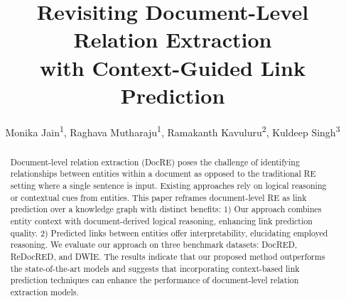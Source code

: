 \documentclass[letterpaper]{article} %
\title{Revisiting Document-Level Relation Extraction \\ with Context-Guided Link Prediction}
\author {
    Monika Jain\textsuperscript{\rm 1},
    Raghava Mutharaju\textsuperscript{\rm 1},
    Ramakanth Kavuluru\textsuperscript{\rm 2},
    Kuldeep Singh\textsuperscript{\rm 3}
}
\begin{document}
\maketitle


\begin{abstract}

Document-level relation extraction (DocRE) poses the challenge of identifying relationships between entities within a document as opposed to the traditional RE setting where a single sentence is input. Existing approaches rely on logical reasoning or contextual cues from entities. This paper reframes document-level RE as link prediction over a knowledge graph with distinct benefits: 1) Our approach combines entity context with document-derived logical reasoning, enhancing link prediction quality. 2) Predicted links between entities offer interpretability, elucidating employed reasoning. 
We evaluate our approach on three benchmark datasets: DocRED, ReDocRED, and DWIE. The results indicate that our proposed method outperforms the state-of-the-art models and suggests that incorporating context-based link prediction techniques can enhance the performance of document-level relation extraction models. 





\end{abstract}
\end{document}
